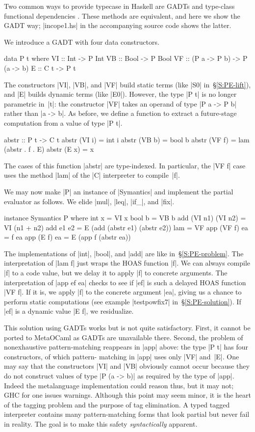 \documentclass[preprint]{sigplanconf}
\begin{document}
Two common ways to provide typecase in Haskell are
GADTs and type-class functional dependencies
\citep{oliveira-typecase}.  These
methods are equivalent, and here we show the GADT way; |incope1.hs|
in the accompanying source code shows the latter.

We introduce a GADT with four data constructors.
\begin{code}
data P t where
  VI :: Int  -> P Int
  VB :: Bool -> P Bool
  VF :: (P a -> P b) -> P (a -> b)
  E  :: C t -> P t
\end{code}
The constructors |VI|, |VB|, and |VF| build static terms (like |S0|
in~\S\ref{S:PE-lift}), and |E| builds dynamic terms (like |E0|).  However,
the type |P t| is no longer parametric in~|t|: the constructor |VF| takes an
operand of type |P a -> P b| rather than |a -> b|. As before, we define a
function to extract a future-stage computation from a value of type |P t|.
\begin{code}
abstr :: P t -> C t
abstr (VI i) = int i
abstr (VB b) = bool b
abstr (VF f) = lam (abstr . f . E)
abstr (E x)  = x
\end{code}
The cases of this function |abstr| are type-indexed.  In particular, the |VF f|
case uses the method |lam| of the |C| interpreter to compile~|f|.

We may now make |P| an instance of
|Symantics| and implement the partial evaluator as follows. We elide
|mul|, |leq|, |if_|, and |fix|.
\begin{code}
instance Symantics P where
  int x  = VI x
  bool b = VB b
  add (VI n1) (VI n2) = VI (n1 + n2)
  add e1 e2 = E (add (abstr e1) (abstr e2))
  lam = VF
  app (VF f) ea = f ea
  app (E f)  ea = E (app f (abstr ea))
\end{code}
The implementations of |int|, |bool|, and |add| are like
in~\S\ref{S:PE-problem}.
The interpretation of |lam f| just wraps the
HOAS function |f|. We can always compile |f| to a code value,
but we delay it to apply |f| to concrete arguments. The interpretation of
|app ef ea| checks to see if |ef| is such a delayed
HOAS function |VF f|. If it is, we apply |f| to the
concrete argument |ea|, giving us a chance to perform static
computations (see example |testpowfix7| in~\S\ref{S:PE-solution}). If |ef| is a
dynamic value |E f|, we residualize.

This solution using GADTs works but is not quite satisfactory. First, it
cannot be ported to MetaOCaml as GADTs are unavailable there.  Second,
the problem of nonexhaustive pattern\hyp matching reappears in |app|
above: the type |P t| has four constructors, of which pattern\hyp
matching in |app| uses only |VF| and~|E|. One may say that the
constructors |VI| and |VB| obviously cannot occur because they do not
construct values of type |P (a -> b)| as required by the type of |app|.
Indeed the metalanguage implementation could reason thus, but it may not; GHC for one
issues warnings.  Although this point may seem minor, it is the heart of
the tagging problem and the purpose of tag elimination. A typed tagged
interpreter contains many pattern\hyp matching forms that look partial
but never fail in reality. The goal is to make this safety
\emph{syntactically} apparent.
\end{document}
